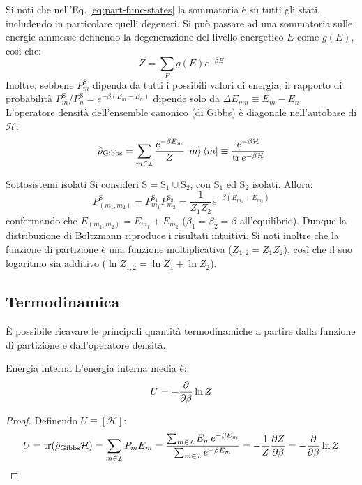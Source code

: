 Si noti che nell'Eq. \ref{eq:part-func-states} la sommatoria è su tutti gli stati, includendo in particolare quelli degeneri. Si può passare ad una sommatoria sulle energie ammesse definendo la degenerazione del livello energetico $ E $ come $ g(E) $, così che:
\begin{equation}
	Z = \sum_E g(E) e^{- \beta E}
\end{equation}
Inoltre, sebbene $ P_m^\text{S} $ dipenda da tutti i possibili valori di energia, il rapporto di probabilità $ P_m^\text{S} / P_n^\text{S} = e^{-\beta (E_m - E_n)} $ dipende solo da $ \Delta E_{mn} \equiv E_m - E_n $. \\
L'operatore densità dell'ensemble canonico (di Gibbs) è diagonale nell'autobase di $ \mathcal{H} $:
\begin{equation}
	\hat{\rho}_\text{Gibbs} = \sum_{m \in \mathcal{I}} \frac{e^{-\beta E_m}}{Z} \ket{m}\bra{m} \equiv \frac{e^{-\beta \mathcal{H}}}{\operatorname{tr} e^{-\beta \mathcal{H}}}
	\label{eq:op-dens-gibbs}
\end{equation}

\begin{example}{Sottosistemi isolati}{}
	Si consideri $ \text{S} = \text{S}_1 \cup \text{S}_2 $, con $ \text{S}_1 $ ed $ \text{S}_2 $ isolati. Allora:
	\begin{equation*}
		P_{(m_1,m_2)}^\text{S} = P_{m_1}^{\text{S}_1} P_{m_2}^{\text{S}_2} = \frac{1}{Z_1 Z_2} e^{-\beta (E_{m_1} + E_{m_2})}
	\end{equation*}
	confermando che $ E_{(m_1,m_2)} = E_{m_1} + E_{m_2} $ ($ \beta_1 = \beta_2 = \beta $ all'equilibrio). Dunque la distribuzione di Boltzmann riproduce i risultati intuitivi. Si noti inoltre che la funzione di partizione è una funzione moltiplicativa ($ Z_{1,2} = Z_1 Z_2 $), così che il suo logaritmo sia additivo ($ \ln Z_{1,2} = \ln Z_1 + \ln Z_2 $).
\end{example}

\subsection{Termodinamica}

È possibile ricavare le principali quantità termodinamiche a partire dalla funzione di partizione e dall'operatore densità.

\begin{proposition}{Energia interna}{}
	L'energia interna media è:
	\begin{equation}
		U = - \frac{\partial}{\partial \beta} \ln Z
		\label{eq:int-en-z}
	\end{equation}

	\tcblower

	\begin{proof}
		Definendo $ U \equiv [\mathcal{H}] $:
		\begin{equation*}
			U = \operatorname{tr}(\hat{\rho}_\text{Gibbs} \mathcal{H}) = \sum_{m \in \mathcal{I}} P_m E_m = \frac{\sum_{m \in \mathcal{I}} E_m e^{-\beta E_m}}{\sum_{m \in \mathcal{I}} e^{- \beta E_m}} = - \frac{1}{Z} \frac{\partial Z}{\partial \beta} = - \frac{\partial}{\partial \beta} \ln Z
		\end{equation*}
	\end{proof}
\end{proposition}


